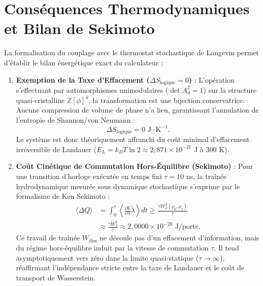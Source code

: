 \documentclass[10pt,twocolumn,a4paper]{article}
\theoremstyle{plain}
\theoremstyle{definition}
\begin{document}
\section{Conséquences Thermodynamiques et Bilan de Sekimoto}
La formalisation du couplage avec le thermostat stochastique de Langevin permet d'établir le bilan énergétique exact du calculateur :
\begin{enumerate}
    \item \textbf{Exemption de la Taxe d'Effacement ($\Delta S_{\text{logique}} = 0$)} : L'opération s'effectuant par automorphismes unimodulaires ($\det A_d^2 = 1$) sur la structure quasi-cristalline $\mathbb{Z}[\phi]^4$, la transformation est une bijection conservatrice. Aucune compression de volume de phase n'a lieu, garantissant l'annulation de l'entropie de Shannon/von Neumann :
    \begin{equation}
    \Delta S_{\text{logique}} = 0 \text{ J}\cdot\text{K}^{-1}.
    \label{eq:entropie_logique_nulle}
    \end{equation}
    Le système est donc théoriquement affranchi du coût minimal d'effacement irréversible de Landauer ($E_L = k_B T \ln 2 \approx 2{,}871 \times 10^{-21}$ J à 300 K).
    \item \textbf{Coût Cinétique de Commutation Hors-Équilibre (Sekimoto)} : Pour une transition d'horloge exécutée en temps fini $\tau = 10$ ns, la traînée hydrodynamique mesurée sous dynamique stochastique s'exprime par le formalisme de Ken Sekimoto :
    \begin{align}
    \langle \Delta Q \rangle &= \int_0^\tau \left\langle \frac{\partial V}{\partial \lambda} \dot{\lambda} \right\rangle dt \ge \frac{\gamma \mathcal{W}_2^2(\rho_0, \rho_\tau)}{\tau} \nonumber \\
    &\approx \frac{\gamma W_2^2}{\tau} \approx 2{,}0000 \times 10^{-20} \text{ J/porte}.
    \label{eq:sekimoto_dissipation}
    \end{align}
    Ce travail de traînée $W_{\text{diss}}$ ne découle pas d'un effacement d'information, mais du régime hors-équilibre induit par la vitesse de commutation $\tau$. Il tend asymptotiquement vers zéro dans la limite quasi-statique ($\tau \to \infty$), réaffirmant l'indépendance stricte entre la taxe de Landauer et le coût de transport de Wasserstein.
\end{enumerate}
\end{document}
